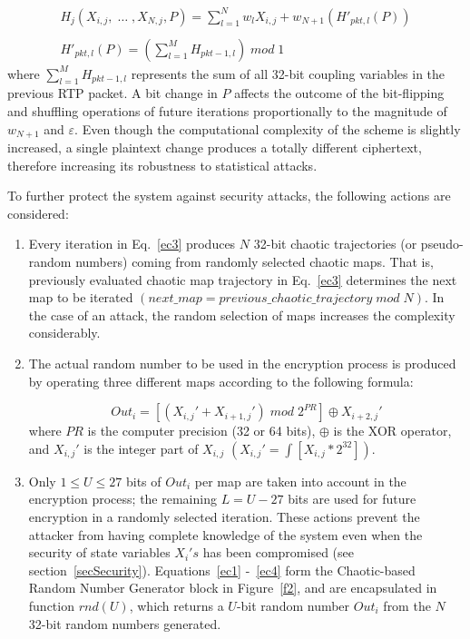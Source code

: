 \documentclass[preprint]{elsarticle}
\begin{document}
\begin{equation}
\begin{array}{c}
\displaystyle{
H_{j}(X_{i,j},\; \ldots \; ,	X_{N,j},P)= \sum_{l=1}^{N}w_{l}X_{i,j}+ w_{N+1}\left(H'_{pkt,l}(P)\right)
} 
 \\
 \\
\displaystyle{
H'_{pkt,l}(P)=  \left(\sum_{l=1}^{M}H_{pkt-1,l} \right) \; mod \; 1
}
\end{array}
\label{ec3}
\end{equation}
where $\sum_{l=1}^{M}H_{pkt-1,l} $ represents the sum of all 32-bit coupling variables in the previous RTP packet. A bit change in $P$ affects the outcome of the bit-flipping and shuffling operations of future iterations proportionally to the magnitude of $w_{N+1}$ and $\varepsilon$. Even though the computational complexity of the scheme is slightly increased, a single plaintext change produces a totally different ciphertext, therefore increasing its robustness to statistical attacks. 

To further protect the system against security attacks, the following actions are considered:

\begin{enumerate}
\item Every iteration in Eq.~\ref{ec3} produces $N$ 32-bit chaotic trajectories (or pseudo-random numbers) coming from randomly selected chaotic maps. That is, previously evaluated chaotic map trajectory in Eq.~\ref{ec3} determines the next map to be iterated $(next\_map = previous\_chaotic\_trajectory\; mod\; N)$. In the case of an attack, the random selection of maps increases the complexity considerably.

\item The actual random number to be used in the encryption process is produced by operating three different maps according to the following formula:

\begin{equation}
Out_{i}= \left[  (X_{i,j}' + X_{i+1,j}')\; mod \;2^{PR}   \right] \oplus X_{i+2,j}'
\label{ec4}
\end{equation}
where $PR$ is the computer precision (32 or 64 bits), $\oplus$ is the XOR operator, and $X_{i,j}'$ is the integer part of $X_{i,j}$ $(X_{i,j}' =\int [X_{i,j} \ast 2^{32} ])$.

\item Only $1 \leq U \leq 27$ bits of $Out_{i}$ per map are taken into account in the encryption process; the remaining $L=U-27$ bits are used for future encryption in a randomly selected iteration. These actions prevent the attacker from having complete knowledge of the system even when the security of state variables $X_{i}'s$ has been compromised (see section~\ref{secSecurity}). Equations~\ref{ec1} -~\ref{ec4} form the Chaotic-based Random Number Generator block in Figure~\ref{f2}, and are encapsulated in function $rnd (U)$, which returns a $U$-bit random number $Out_{i}$ from the $N$ 32-bit random numbers generated.
\end{enumerate}
\end{document}
